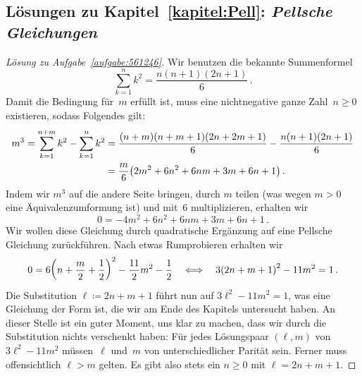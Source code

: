 \subsection*{Lösungen zu Kapitel~\ref{kapitel:Pell}: \emph{Pellsche Gleichungen}}

\begin{proof}[Lösung zu Aufgabe~\ref{aufgabe:561246}]
	Wir benutzen die bekannte Summenformel
	\begin{equation*}
		\sum_{k=1}^nk^2=\frac{n(n+1)(2n+1)}{6}\,.
	\end{equation*}
	Damit die Bedingung für~$m$ erfüllt ist, muss eine nichtnegative ganze Zahl~$n\geqslant 0$ existieren, sodass Folgendes gilt:
	\begin{align*}
		m^3=\sum_{k=1}^{n+m}k^2-\sum_{k=1}^nk^2&=\frac{(n+m)(n+m+1)(2n+2m+1)}{6}-\frac{n(n+1)(2n+1)}{6}\\
		&=\frac{m}{6}\parens*{2m^2+6n^2+6nm+3m+6n+1}\,.
	\end{align*}
	Indem wir $m^3$ auf die andere Seite bringen, durch $m$ teilen (was wegen $m>0$ eine Äquivalenzumformung ist) und mit~$6$ multiplizieren, erhalten wir
	\begin{equation*}
		0=-4m^2+6n^2+6nm+3m+6n+1\,.
	\end{equation*}
	Wir wollen diese Gleichung durch quadratische Ergänzung auf eine Pellsche Gleichung zurückführen. Nach etwas Rumprobieren erhalten wir
	\begin{equation*}
		0=6\parens*{n+\frac{m}{2}+\frac12}^2-\frac{11}2m^2-\frac12\quad\Longleftrightarrow\quad 3\parens*{2n+m+1}^2-11m^2=1\,.
	\end{equation*}
	Die Substitution $\ell\coloneqq 2n+m+1$ führt nun auf $3\ell^2-11m^2=1$, was eine Gleichung der Form ist, die wir am Ende des Kapitels untersucht haben. An dieser Stelle ist ein guter Moment, uns klar zu machen, dass wir durch die Substitution nichts verschenkt haben: Für jedes Lösungspaar $(\ell,m)$ von $3\ell^2-11m^2$ müssen~$\ell$ und~$m$ von unterschiedlicher Parität sein. Ferner muss offensichtlich $\ell>m$ gelten. Es gibt also stets ein $n\geqslant 0$ mit $\ell=2n+m+1$.
	

\end{proof}
